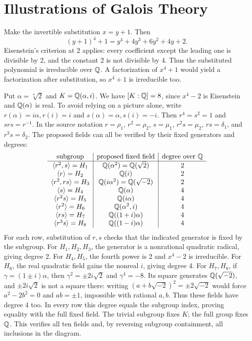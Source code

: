 \section{Illustrations of Galois Theory}

Make the invertible substitution $x=y+1$. Then
\[(y+1)^4+1=y^4+4y^3+6y^2+4y+2.\]
Eisenstein's criterion at 2 applies: every coefficient except the leading one is divisible by 2, and the constant 2 is not divisible by 4. Thus the substituted polynomial is irreducible over $\mathbb{Q}$. A factorization of $x^4+1$ would yield a factorization after substitution, so $x^4+1$ is irreducible too.

Put $\alpha=\sqrt[4]2$ and $K=\mathbb{Q}(\alpha,i)$. We have $[K:\mathbb{Q}]=8$, since $x^4-2$ is Eisenstein and $\mathbb{Q}(\alpha)$ is real. To avoid relying on a picture alone, write $r(\alpha)=i\alpha,r(i)=i$ and $s(\alpha)=\alpha,s(i)=-i$. Then $r^4=s^2=1$ and $srs=r^{-1}$. In the source notation $r=\rho_1$, $r^2=\rho_2$, $s=\mu_1$, $r^2s=\mu_2$, $rs=\delta_1$, and $r^3s=\delta_2$.
The proposed fields can all be verified by their fixed generators and degrees:
\[
\begin{array}{c|c|c}
\text{subgroup}&\text{proposed fixed field}&\text{degree over }\mathbb{Q}\\\hline
\langle r^2,s\rangle=H_1&\mathbb{Q}(\alpha^2)=\mathbb{Q}(\sqrt2)&2\\
\langle r\rangle=H_2&\mathbb{Q}(i)&2\\
\langle r^2,rs\rangle=H_3&\mathbb{Q}(i\alpha^2)=\mathbb{Q}(\sqrt{-2})&2\\
\langle s\rangle=H_4&\mathbb{Q}(\alpha)&4\\
\langle r^2s\rangle=H_5&\mathbb{Q}(i\alpha)&4\\
\langle r^2\rangle=H_6&\mathbb{Q}(\alpha^2,i)&4\\
\langle rs\rangle=H_7&\mathbb{Q}((1+i)\alpha)&4\\
\langle r^3s\rangle=H_8&\mathbb{Q}((1-i)\alpha)&4
\end{array}
\]
For each row, substitution of $r,s$ checks that the indicated generator is fixed by the subgroup. For $H_1,H_2,H_3$, the generator is a nonrational quadratic radical, giving degree 2. For $H_4,H_5$, the fourth power is 2 and $x^4-2$ is irreducible. For $H_6$, the real quadratic field gains the nonreal $i$, giving degree 4. For $H_7,H_8$, if $\gamma=(1\pm i)\alpha$, then $\gamma^2=\pm2i\sqrt2$ and $\gamma^4=-8$. Its square generates $\mathbb{Q}(\sqrt{-2})$, and $\pm2i\sqrt2$ is not a square there: writing $(a+b\sqrt{-2})^2=\pm2\sqrt{-2}$ would force $a^2-2b^2=0$ and $ab=\pm1$, impossible with rational $a,b$. Thus these fields have degree 4 too. In every row this degree equals the subgroup index, proving equality with the full fixed field. The trivial subgroup fixes $K$; the full group fixes $\mathbb{Q}$. This verifies all ten fields and, by reversing subgroup containment, all inclusions in the diagram.

